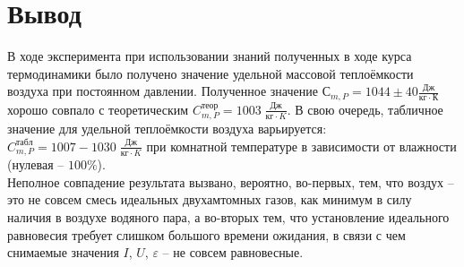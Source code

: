 \documentclass[a4paper,12pt]{article}
\begin{document}
	\section{Вывод}

	В ходе эксперимента при использовании знаний полученных в ходе курса термодинамики было получено значение удельной массовой теплоёмкости воздуха при постоянном давлении. Полученное значение $С_{m, P} = 1044 \pm 40 \frac{Дж}{кг\cdot К}$ хорошо совпало с теоретическим $C_{m, P}^{теор} = 1003 \; \frac{Дж}{кг\cdot K}$. В свою очередь, табличное значение для удельной теплоёмкости воздуха варьируется: $C_{m, P}^{табл} = 1007-1030 \; \frac{Дж}{кг\cdot K}$ при комнатной температуре в зависимости от влажности (нулевая -- $100\%$).
	\\ Неполное совпадение результата вызвано, вероятно, во-первых, тем, что воздух -- это не совсем смесь идеальных двухамтомных газов, как минимум в силу наличия в воздухе водяного пара, а во-вторых тем, что установление идеального равновесия требует слишком большого времени ожидания, в связи с чем снимаемые значения $I$, $U$, $\varepsilon$ -- не совсем равновесные.
\end{document}
